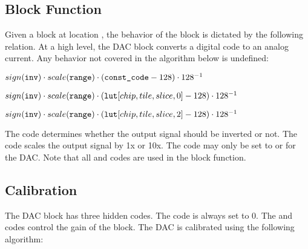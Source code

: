 \subsection{Block Function}\label{dac:blockfun}

Given a block at location , the behavior of the block
is dictated by the following relation. At a high level, the DAC block converts a
digital code to an analog current. Any behavior not covered in the algorithm
below is undefined:

\begin{algorithmic}

    \State $sign(\tx{inv}) \cdot scale(\tx{range}) \cdot (\tx{const_code}-128)\cdot 128^{-1}$

    \State $sign(\tx{inv}) \cdot scale(\tx{range}) \cdot (\tx{lut}\hindex{chip}{tile}{slice}{0}-128)\cdot 128^{-1}$

    \State $sign(\tx{inv}) \cdot scale(\tx{range}) \cdot (\tx{lut}\hindex{chip}{tile}{slice}{2}-128)\cdot 128^{-1}$
    \EndIf
 \EndIf
\end{algorithmic}

The  code determines whether the output signal should be inverted or
not. The  code scales the output signal by 1x or 10x. The 
code may only be set to  or  for the DAC. Note
that all \static and \dynamic codes are used in the block function.

\subsection{Calibration}
The DAC block has three hidden codes. The
 code is always set to $0$. The  and  codes
control the gain of the block. The DAC is calibrated using the following
algorithm:

\begin{algorithmic}
    \EndFor
  \EndFor

  \EndFor
\end{algorithmic}

